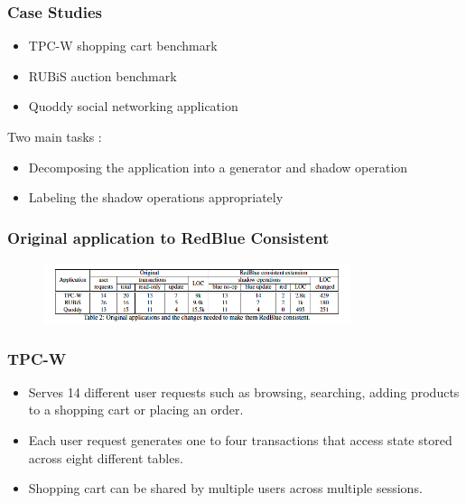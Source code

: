 \documentclass{beamer}
\begin{document}

\begin{frame}
\frametitle{Case Studies}
\begin{itemize}
\item TPC-W shopping cart benchmark
\item RUBiS auction benchmark
\item Quoddy social networking application
\end{itemize} 
Two main tasks :
\begin{itemize}
\item Decomposing the application into a generator and shadow operation
\item Labeling the shadow operations appropriately
\end{itemize}
\end{frame}


\begin{frame}
\frametitle{Original application to RedBlue Consistent}
\begin{figure}[t]
\includegraphics[width=9cm]{pic10.jpg}
\centering
\end{figure}

\end{frame}



\begin{frame}
\frametitle{TPC-W}
\begin{itemize}
\item Serves 14 different user requests such as browsing, searching, adding products to a shopping cart or placing an order.
\item Each user request generates one to four transactions that access state stored across eight different tables.
\item Shopping cart can be shared by multiple users across multiple sessions.
\end{itemize}
\end{frame}

\end{document}
